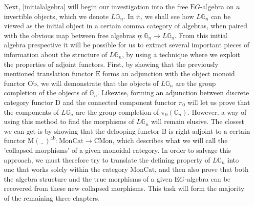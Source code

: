 Next, \cref{initialalgebra} will begin our investigation into the free $\mathrm{E}G$-algebra on $n$ invertible objects, which we denote $L\mathbb{G}_n$. In it, we shall see how $L\mathbb{G}_n$ can be viewed as the initial object in a certain comma category of algebras, when paired with the obvious map between free algebras $\eta: \mathbb{G}_n \to L\mathbb{G}_n$. From this initial algebra prespective it will be possible for us to extract several important pieces of information about the structure of $L\mathbb{G}_n$, by using a technique where we exploit the properties of adjoint functors. First, by showing that the previously mentioned translation functor $\mathrm{E}$ forms an adjunction with the object monoid functor $\mathrm{Ob}$, we will demonstrate that the objects of $L\mathbb{G}_n$ are the group completion of the objects of $\mathbb{G}_n$. Likewise, forming an adjunction between discrete category functor $\mathrm{D}$ and the connected component functor $\pi_0$ will let us prove that the components of $L\mathbb{G}_n$ are the group completion of $\pi_0(\mathbb{G}_n)$. However, a way of using this method to find the morphisms of $L\mathbb{G}_n$ will remain elusive. The closest we can get is by showing that the delooping functor $\mathrm{B}$ is right adjoint to a certain functor $\mathrm{M}( \, \_ \,)^{\mathrm{ab}} : \mathrm{MonCat} \to \mathrm{CMon}$, which describes what we will call the 'collapsed morphisms' of a given monoidal category. In order to salvage this approach, we must therefore try to translate the defining property of $L\mathbb{G}_n$ into one that works solely within the category $\mathrm{MonCat}$, and then also prove that both the algebra structure and the true morphisms of a given $\mathrm{E}G$-algebra can be recovered from these new collapsed morphisms. This task will form the majority of the remaining three chapters.

